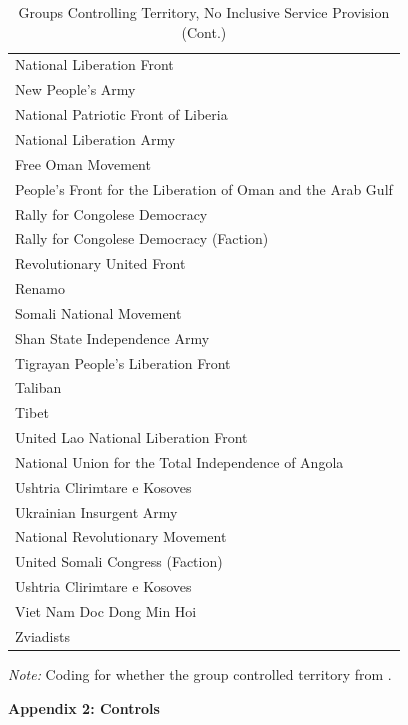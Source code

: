\documentclass[12pt, letterpaper]{article}
\begin{document}
\begin{center}
\newpage
\begin{table}[htbp]
\begin{center}
\small
\setcounter{table}{2}
\renewcommand\thetable{A.\Roman{table}}
\caption{Groups Controlling Territory, No Inclusive Service Provision (Cont.)}
 \begin{tabular}{l} 
National Liberation Front \\
New People's Army \\
National Patriotic Front of Liberia \\
National Liberation Army \\
Free Oman Movement \\
People's Front for the Liberation of Oman and the Arab Gulf\\
Rally for Congolese Democracy \\
Rally for Congolese Democracy (Faction) \\
Revolutionary United Front \\
Renamo \\
Somali National Movement \\
Shan State Independence Army \\
Tigrayan People's Liberation Front \\
Taliban \\
Tibet \\
United Lao National Liberation Front \\
National Union for the Total Independence of Angola \\
Ushtria Clirimtare e Kosoves \\
Ukrainian Insurgent Army \\
National Revolutionary Movement \\
United Somali Congress (Faction) \\
Ushtria Clirimtare e Kosoves \\
Viet Nam Doc Dong Min Hoi \\
Zviadists \\
\hline \hline
\end{tabular}
\begin{tablenotes}
\raggedright \footnotesize{\textit{Note:} Coding for whether the group controlled territory from \citep{cunningham2009takes}.} 
\end{tablenotes}
\end{center}
\end{table}

\newpage
\clearpage

\Large{\textbf{Appendix 2: Controls}}
\end{center}
\end{document}
